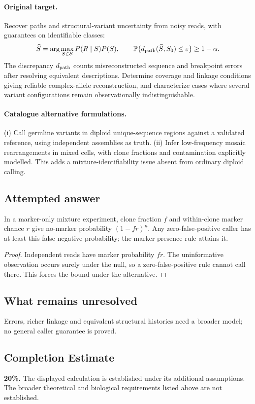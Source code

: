 \documentclass[11pt]{article}
\begin{document}
\paragraph{Original target.}
Recover paths and structural-variant uncertainty from noisy reads, with guarantees on identifiable classes:
\[\widehat S=\arg\max_{S\in\mathcal S}P(R\mid S)P(S),\qquad \mathbb{P}\{d_{\rm path}(\widehat S,S_0)\le\varepsilon\}\ge1-\alpha.\]
The discrepancy $d_{\rm path}$ counts misreconstructed sequence and breakpoint errors after resolving equivalent descriptions. Determine coverage and linkage conditions giving reliable complex-allele reconstruction, and characterize cases where several variant configurations remain observationally indistinguishable.
\paragraph{Catalogue alternative formulations.}
(i) Call germline variants in diploid unique-sequence regions against a validated reference, using independent assemblies as truth. (ii) Infer low-frequency mosaic rearrangements in mixed cells, with clone fractions and contamination explicitly modelled. This adds a mixture-identifiability issue absent from ordinary diploid calling.
\subsection{Attempted answer}
\begin{proposition}
In a marker-only mixture experiment, clone fraction $f$ and within-clone marker chance $r$ give no-marker probability $(1-fr)^n$. Any zero-false-positive caller has at least this false-negative probability; the marker-presence rule attains it.
\end{proposition}
\begin{proof}
Independent reads have marker probability $fr$. The uninformative observation occurs surely under the null, so a zero-false-positive rule cannot call there. This forces the bound under the alternative.
\end{proof}
\subsection{What remains unresolved}
Errors, richer linkage and equivalent structural histories need a broader model; no general caller guarantee is proved.
\subsection{Completion Estimate}
\textbf{20\%.} The displayed calculation is established under its additional assumptions. The broader theoretical and biological requirements listed above are not established.
\end{document}
